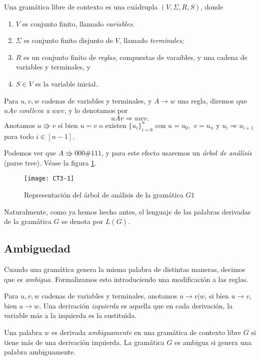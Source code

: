 \begin{definicion}
    Una gram\'atica libre de contexto es una cu\'adrupla \((V,\Sigma,R,S)\), donde
    \begin{enumerate}
        \item \(V\) es conjunto finito, llamado \emph{variables.}
        \item \(\Sigma\) es conjunto finito disjunto de \(V\), llamado \emph{terminales;}
        \item \(R\) es un conjunto finito de \emph{reglas,} compuestas de varaibles, y una cadena de variables y terminales, y
        \item \(S \in V\) es la variable inicial.
    \end{enumerate}
\end{definicion}

Para \(u,v,w\) cadenas de variables y terminales, y \(A \to w\) una regla, diremos que \(uAv\) \emph{conlleva a } \(uwv\), y lo denotamos por \[uAv \Rightarrow uwv.\]
Anotamos \(u \Rrightarrow v \) si bien \(u=v\) o existen \(\{u_i\}_{i=0}^n\) con \(u=u_0,\) \(v=u_n\) y \(u_i \Rightarrow u_{i+1}\) para todo \(i \in [n-1].\)

Podemos ver que \(A\Rrightarrow 000\# 111\), y para este efecto usaremos un \emph{\'arbol de an\'alisis} (parse tree).
V\'ease la figura \ref{CT3-1}.

\begin{figure}[h!b]
    \centering
    \texttt{[image: CT3-1]}
    \caption{ Representaci\'on del \'arbol de an\'alisis de la gram\'atica \(G1\) }\label{CT3-1}
\end{figure}

Naturalmente, como ya hemos hecho antes, el lenguaje de las palabras derivadas de la gram\'atica \(G\) se denota por \(L(G)\).

\subsection{Ambiguedad}

Cuando una gram\'atica genera la misma palabra de distintas maneras, decimos que es \emph{ambigua.}
Formalizamos esto introduciendo una modificaci\'on a las reglas.

Para \(u,v,w\) cadenas de variables y terminales, anotamos \(u\to v | w \), si bien \(u\to v\), bien \(u \to w.\)
Una derivaci\'on \emph{izquierda} es aquella que en cada derivaci\'on, la variable m\'as a la izquierda es la sustituida.

\begin{definicion}
    Una palabra \(w\) es derivada \emph{ambiguamente} en una gram\'atica de contexto libre \(G\) si tiene m\'as de una derivaci\'on izquierda. La gram\'atica \(G\) es ambigua si genera una palabra ambiguamente.
\end{definicion}

